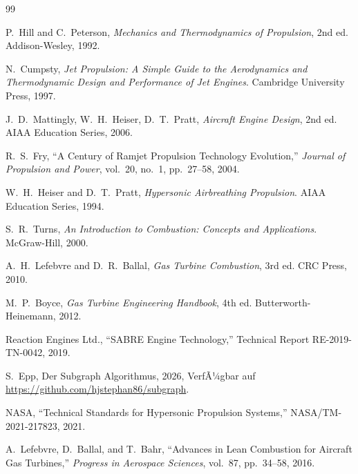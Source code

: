 ﻿\documentclass[12pt,a4paper]{article}
\theoremstyle{remark}
\begin{document}
\begin{thebibliography}{99}

P.~Hill and C.~Peterson,
\textit{Mechanics and Thermodynamics of Propulsion}, 2nd ed.
Addison-Wesley, 1992.

N.~Cumpsty,
\textit{Jet Propulsion: A Simple Guide to the Aerodynamics and Thermodynamic Design and Performance of Jet Engines}.
Cambridge University Press, 1997.

J.~D.~Mattingly, W.~H.~Heiser, D.~T.~Pratt,
\textit{Aircraft Engine Design}, 2nd ed.
AIAA Education Series, 2006.

R.~S.~Fry,
``A Century of Ramjet Propulsion Technology Evolution,''
\textit{Journal of Propulsion and Power}, vol.~20, no.~1, pp.~27--58, 2004.

W.~H.~Heiser and D.~T.~Pratt,
\textit{Hypersonic Airbreathing Propulsion}.
AIAA Education Series, 1994.

S.~R.~Turns,
\textit{An Introduction to Combustion: Concepts and Applications}.
McGraw-Hill, 2000.

A.~H.~Lefebvre and D.~R.~Ballal,
\textit{Gas Turbine Combustion}, 3rd ed.
CRC Press, 2010.

M.~P.~Boyce,
\textit{Gas Turbine Engineering Handbook}, 4th ed.
Butterworth-Heinemann, 2012.

Reaction Engines Ltd.,
``SABRE Engine Technology,''
Technical Report RE-2019-TN-0042, 2019.

S.~Epp, Der Subgraph Algorithmus, 2026, VerfÃ¼gbar auf \url{https://github.com/hjstephan86/subgraph}.

NASA,
``Technical Standards for Hypersonic Propulsion Systems,''
NASA/TM-2021-217823, 2021.

A.~Lefebvre, D.~Ballal, and T.~Bahr,
``Advances in Lean Combustion for Aircraft Gas Turbines,''
\textit{Progress in Aerospace Sciences}, vol.~87, pp.~34--58, 2016.

\end{thebibliography}
\end{document}

